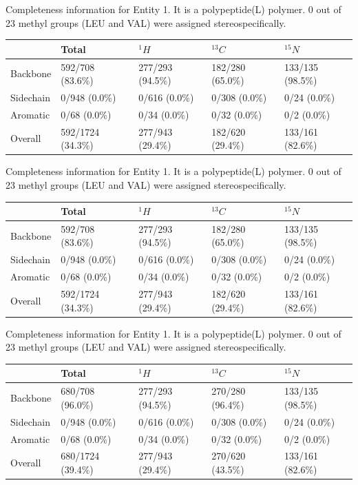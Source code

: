 Completeness information for Entity 1. It is a polypeptide(L) polymer. 0 out of 23 methyl groups (LEU and VAL) were assigned stereospecifically.\begin{longtable}{|l|l|l|l|l|}
\hline
  & Total & $^{1}H$ & $^{13}C$ & $^{15}N$\\\hline
Backbone & 592/708 (83.6\%)& 277/293 (94.5\%)& 182/280 (65.0\%)& 133/135 (98.5\%) \\
\hline
Sidechain & 0/948 (0.0\%)& 0/616 (0.0\%)& 0/308 (0.0\%)& 0/24 (0.0\%) \\
\hline
Aromatic & 0/68 (0.0\%)& 0/34 (0.0\%)& 0/32 (0.0\%)& 0/2 (0.0\%) \\
\hline
Overall & 592/1724 (34.3\%)& 277/943 (29.4\%)& 182/620 (29.4\%)& 133/161 (82.6\%) \\
\hline
\end{longtable}
Completeness information for Entity 1. It is a polypeptide(L) polymer. 0 out of 23 methyl groups (LEU and VAL) were assigned stereospecifically.\begin{longtable}{|l|l|l|l|l|}
\hline
  & Total & $^{1}H$ & $^{13}C$ & $^{15}N$\\\hline
Backbone & 592/708 (83.6\%)& 277/293 (94.5\%)& 182/280 (65.0\%)& 133/135 (98.5\%) \\
\hline
Sidechain & 0/948 (0.0\%)& 0/616 (0.0\%)& 0/308 (0.0\%)& 0/24 (0.0\%) \\
\hline
Aromatic & 0/68 (0.0\%)& 0/34 (0.0\%)& 0/32 (0.0\%)& 0/2 (0.0\%) \\
\hline
Overall & 592/1724 (34.3\%)& 277/943 (29.4\%)& 182/620 (29.4\%)& 133/161 (82.6\%) \\
\hline
\end{longtable}
Completeness information for Entity 1. It is a polypeptide(L) polymer. 0 out of 23 methyl groups (LEU and VAL) were assigned stereospecifically.\begin{longtable}{|l|l|l|l|l|}
\hline
  & Total & $^{1}H$ & $^{13}C$ & $^{15}N$\\\hline
Backbone & 680/708 (96.0\%)& 277/293 (94.5\%)& 270/280 (96.4\%)& 133/135 (98.5\%) \\
\hline
Sidechain & 0/948 (0.0\%)& 0/616 (0.0\%)& 0/308 (0.0\%)& 0/24 (0.0\%) \\
\hline
Aromatic & 0/68 (0.0\%)& 0/34 (0.0\%)& 0/32 (0.0\%)& 0/2 (0.0\%) \\
\hline
Overall & 680/1724 (39.4\%)& 277/943 (29.4\%)& 270/620 (43.5\%)& 133/161 (82.6\%) \\
\hline
\end{longtable}
